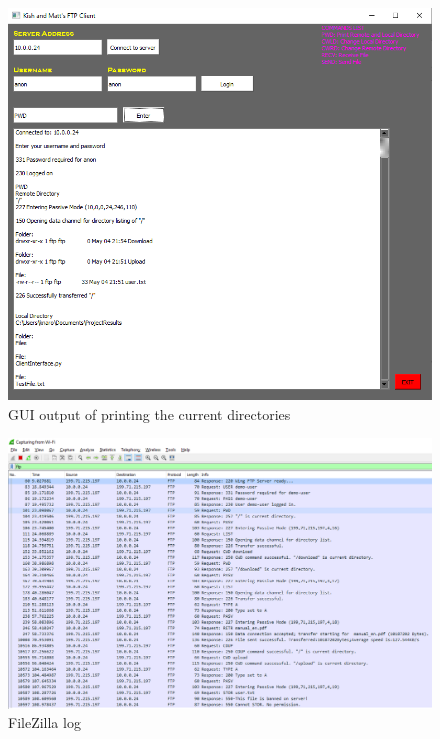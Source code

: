 \documentclass[10pt,twocolumn]{witseiepaper}
\begin{document}
\begin{appendices}
\begin{figure}[h!]
\renewcommand{\thefigure}{\arabic{figure}}
\centering
\includegraphics[scale=0.8]{FileZillaGUI.png}
\caption{GUI output of printing the current directories}
\label{fig: FileZilla GUI}
\end{figure}

\begin{figure}[h!]
\renewcommand{\thefigure}{\arabic{figure}}
\centering
\includegraphics[scale=0.55]{WftpWireshark.png}
\caption{FileZilla log}
\label{fig: Wftp Wireshark}
\end{figure}


\end{appendices}
\end{document}
